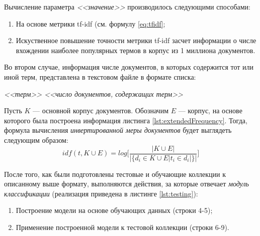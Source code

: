     Вычисление параметра {\it <<значение>>} производилось следующими способами:
    \begin{enumerate}
        \item На основе метрики tf-idf (см. формулу \ref{eq:tfidf};
        \item Искуственное повышение точности метрики tf-idf засчет информации о числе
            вхождении наиболее популярных термов в корпус из 1 миллиона документов.
    \end{enumerate}

    Во втором случае, информация числе документов, в которых содержится тот или
    иной терм, представлена в текстовом файле в формате списка:
    \begin{center}
        \it
        <<терм>> <<число документов, содержащих терм>>
    \end{center}

    Пусть $K$ --- основной корпус документов.
    Обозначим $E$ --- корпус, на основе которого была построена информация листинга
    \ref{lst:extendedFrequency}.
    Тогда, формула вычисления {\it инвертированной меры документов} будет выглядеть
    следующим образом:
    \begin{equation}
        idf(t, K \cup E) = log \Bigg[ \dfrac{|K \cup E|}{|\{d_i \in K \cup E | t_i \in d_i|\}|} \Bigg]
    \end{equation}

    После того, как были подготовлены тестовые и обучающие коллекции к
    описанному выше формату, выполняются действия, за которые
    отвечает {\it модуль классификации} (реализация приведена в листинге
    \ref{lst:testing}):
    \begin{enumerate}
        \item Построение модели на основе обучающих данных (строки 4-5);
        \item Применение построенной модели к тестовой коллекции (строки 6-9).
    \end{enumerate}

    \lstset{style=python}
    


